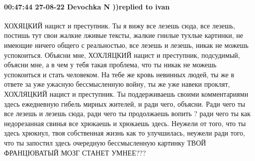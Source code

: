  
 
 
 
 

\paragraph{00:47:44 27-08-22 Devochka N ))replied to ivan}

ХОХЯЦКИЙ нацист и преступник. Ты я вижу все лезешь сюда, все лезешь, постишь
тут свои жалкие лживые тексты, жалкие гнилые тухлые картинки, не имеющие ничего
общего с реальностью, все лезешь и лезешь, никак не можешь успокоиться. Объясни
мне, ХОХЛЯЦКИЙ нацист и преступник, подсудимый, объясни мне, а в чем у тебя
такая проблема, что ты никак не можешь успокоиться и стать человеком. На тебе
же кровь невинных людей, ты же в ответе за уже ужасную бессмысленную войну, ты
же уже навеки проклят, ХОХЛЯЦКИЙ нацист и преступник. Ты поддерживаешь своими
комментариями здесь ежедневную гибель мирных жителей, и ради чего, объясни.
Ради чего ты все лезешь и лезешь сюда, ради чего ты продолжаешь вопить ? ради
чего ты как недорезанная свинья все хрюкаешь и хрюкаешь здесь. Неужели от того,
что ты здесь хрюкнул, твоя собственная жизнь как то улучшилась, неужели ради
того, что ты запостил здесь очередную бессмысленную картинку ТВОЙ ФРАНЦЮВАТЫЙ
МОЗГ СТАНЕТ УМНЕЕ???🤔
